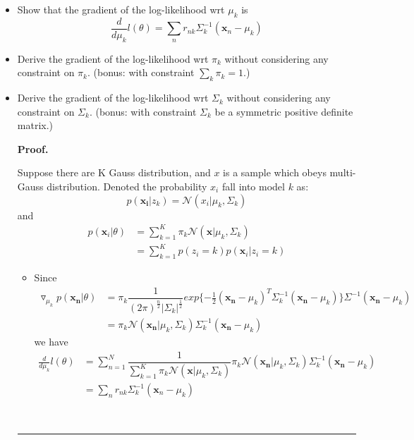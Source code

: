 \documentclass[12pt]{article}%
\newenvironment{proof}[1][Proof]{\textbf{#1.} }{\ \rule{0.5em}{0.5em}}
\begin{document}
\begin{itemize}
	
	\item Show that the gradient of the log-likelihood wrt $\mu_k$ is
	\[ \frac{d}{d\mu_k}l(\theta) = \sum_n r_{nk}\Sigma_k^{-1}(\mathbf{x}_n-\mu_k)
	\]
    \item Derive the gradient of the log-likelihood wrt $\pi_k$ without considering any constraint on $\pi_k$. (bonus: with constraint $\sum_k\pi_k=1$.)
    \item Derive the gradient of the log-likelihood wrt $\Sigma_k$ without considering any constraint on $\Sigma_k$. (bonus: with constraint $\Sigma_k$ be a symmetric positive definite matrix.) 
    
    \begin{proof}
    	
    		Suppose there are K Gauss distribution, and $x$ is a sample which obeys multi-Gauss distribution. Denoted the probability $x_i$ fall into model $k$ as:
    		$$ p(\mathbf{x_i} | z_k) =\mathcal{N}(x_i | \mu_k, \Sigma_k)$$
    		and 
    		\begin{align*}
    			p(\mathbf{x}_i|\theta) &=\sum_{k=1}^{K} \pi_{k} \mathcal{N}(\mathbf{x}|\mu_k,\Sigma_k) \\
    			&= \sum_{k=1}^{K}p(z_i=k)p(\mathbf{x}_i|z_i=k)
    		\end{align*}
    	\begin{itemize}	
    	    \item Since 
    		\begin{align*}
    		\triangledown_{\mu_k} p(\mathbf{x_n}|\theta) &= \pi_k 
    		\dfrac{1}{(2\pi)^{\frac{n}{2}} |\Sigma_k|^{\frac{1}{2}}}
    		exp\{-\frac{1}{2} (\mathbf{x_n}-\mu_k)^T\Sigma_k^{-1}(\mathbf{x_n}-\mu_k)\} \Sigma^{-1}(\mathbf{x_n}-\mu_k)  \\
    		&= \pi_k \mathcal{N}(\mathbf{x_n}| \mu_k, \Sigma_k) \Sigma_k^{-1}(\mathbf{x_n}-\mu_k)
    		\end{align*}
    		we have 
    		\begin{align*}
    			\frac{d}{d\mu_k}l(\theta) &= \sum_{n=1}^{N} \dfrac{1}{\sum_{k=1}^{K} \pi_{k} \mathcal{N}(\mathbf{x}|\mu_k,\Sigma_k)} 
    			\pi_k \mathcal{N}(\mathbf{x_n}| \mu_k, \Sigma_k) \Sigma_k^{-1}(\mathbf{x_n}-\mu_k)\\
    			&= \sum_n r_{nk}\Sigma_k^{-1}(\mathbf{x}_n-\mu_k)
    		\end{align*}
    		

\end{itemize}
\end{proof}
\end{itemize}
\end{document}
